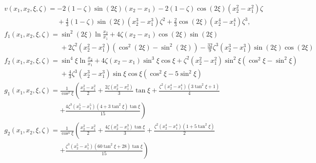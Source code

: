 \documentclass[12pt]{article}
\begin{document}
\begin{subequations}
\begin{align}
&v(x_1,x_2,\xi,\zeta)= -2(1-\zeta)\sin(2\xi)(x_2-x_1)-2(1-\zeta)\cos(2\xi)(x_2^2-x_1^2)\zeta\nonumber\\
&\phantom{v(x_1,x_2,\xi,\zeta)= }+\frac{4}{3}(1-\zeta)\sin(2\xi)(x_2^3-x_1^3)\zeta^2+\frac{2}{3}\cos(2\xi)(x_2^4-x_1^4)\zeta^3,\\
&f_1(x_1,x_2,\xi,\zeta)=\sin^2\left(2\xi\right)\ln\frac{x_2}{x_1}+4\zeta(x_2-x_1)\cos(2\xi)\sin(2\xi)\nonumber\\
&\phantom{f_1(x_1,x_2,\xi,\zeta)=}+2\zeta^2(x_2^2-x_1^2)\left(\cos^2(2\xi)-\sin^2(2\xi)\right)-\frac{32}{9}\zeta^3(x_2^3-x_1^3)\sin(2\xi)\cos(2\xi)\\
&f_2(x_1,x_2,\xi,\zeta)=\sin^4\xi\ln\frac{x_2}{x_1}+4\zeta(x_2-x_1)\sin^3\xi\cos\xi+\zeta^2(x_2^2-x_1^2)\sin^2\xi(\cos^2\xi-\sin^2\xi)\nonumber\\
&\phantom{f_2(x_1,x_2,\xi,\zeta)=}+\frac{4}{3}\zeta^3(x_2^3-x_1^3)\sin\xi\cos\xi\left(\cos^2\xi-5\sin^2\xi\right)\\
&g_1(x_1,x_2,\xi,\zeta)=\frac{1}{\cos^2\xi}\left(\frac{x_2^2-x_1^2}{2}+\frac{2\zeta(x_2^3-x_1^2)}{3}\tan\xi+\frac{\zeta^2(x_2^4-x_1^4)(3\tan^2\xi+1)}{4}\right.\nonumber\\
&\phantom{g_1(x_1,x_2,\xi,\zeta)=}\left.+\frac{4\zeta^3(x_2^5-x_1^5)(4+3\tan^2\xi)\tan\xi}{15}\right)\\
&g_2(x_1,x_2,\xi,\zeta)=\frac{1}{\cos^4\xi}\left(\frac{x_2^2-x_1^2}{2}+\frac{4\zeta(x_2^3-x_1^3)\tan\xi}{3}+\frac{\zeta^2(x_2^4-x_1^4)(1+5\tan^2\xi)}{2}\right.\nonumber\\
&\phantom{g_2(x_1,x_2,\xi,\zeta)=}\left.+\frac{\zeta^3(x_2^5-x_1^5)(60\tan^2\xi+28)\tan\xi}{15}\right)
\end{align}
\end{subequations}
\end{document}
